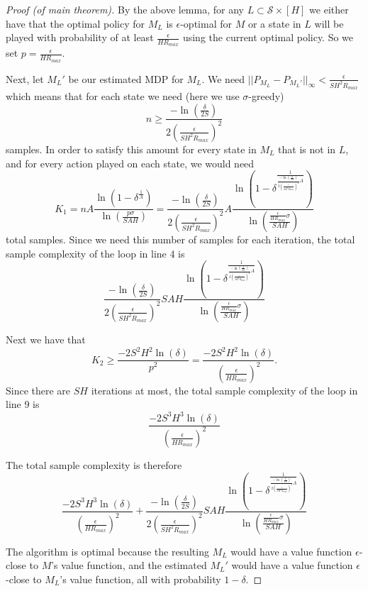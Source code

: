 \documentclass[12pt, letterpaper]{article}
\theoremstyle{definition}
\theoremstyle{remark}
\begin{document}
\begin{proof}[Proof (of main theorem)]
    By the above lemma, for any \(L \subset \mathcal{S} \times [H]\) we either have that the optimal policy for \(M_L\) is \(\epsilon\)-optimal for \(M\) or a state in \(L\) will  be played with probability of at least \(\frac{\epsilon}{HR_{max}}\) using the current optimal policy. So we set \(p = \frac{\epsilon}{HR_{max}}\).

    Next, let \(M_L'\) be our estimated MDP for \(M_L\). We need \(||P_{M_L} - P_{M_{L}'}||_{\infty} < \frac{\epsilon}{SH^2 R_{max}}\) which means that for each state we need (here we use \(\sigma\)-greedy)
    \[n \geq \frac{-\ln(\frac{\delta}{2S})}{2(\frac{\epsilon}{SH^2 R_{max}})^2}\]
    samples. In order to satisfy this amount for every state in \(M_L\) that is not in \(L\), and for every action played on each state, we would need
    \[K_1 = nA \frac{\ln(1 - \delta^{\frac{1}{A}})}{\ln(\frac{p\sigma}{SAH})} = \frac{-\ln(\frac{\delta}{2S})}{2(\frac{\epsilon}{SH^2 R_{max}})^2}A \frac{\ln(1 - \delta^{\frac{1}{\frac{-\ln(\frac{\delta}{2S})}{2(\frac{\epsilon}{SH^2 R_{max}})^2} A}})}{\ln(\frac{\frac{\epsilon}{HR_{max}} \sigma}{SAH})}\]
    total samples. Since we need this number of samples for each iteration, the total sample complexity of the loop in line 4 is
    \[\frac{-\ln(\frac{\delta}{2S})}{2(\frac{\epsilon}{SH^2 R_{max}})^2}SAH \frac{\ln(1 - \delta^{\frac{1}{\frac{-\ln(\frac{\delta}{2S})}{2(\frac{\epsilon}{SH^2 R_{max}})^2} A}})}{\ln(\frac{\frac{\epsilon}{HR_{max}} \sigma}{SAH})}\]

    Next we have that
    \[K_2 \geq \frac{-2S^2H^2 \ln(\delta)}{p^2} = \frac{-2S^2H^2 \ln(\delta)}{(\frac{\epsilon}{HR_{max}})^2}.\]
    Since there are \(SH\) iterations at most, the total sample complexity of the loop in line 9 is
    \[\frac{-2S^3H^3 \ln(\delta)}{(\frac{\epsilon}{HR_{max}})^2}\]

    The total sample complexity is therefore
    \[\frac{-2S^3H^3 \ln(\delta)}{(\frac{\epsilon}{HR_{max}})^2} + \frac{-\ln(\frac{\delta}{2S})}{2(\frac{\epsilon}{SH^2 R_{max}})^2}SAH \frac{\ln(1 - \delta^{\frac{1}{\frac{-\ln(\frac{\delta}{2S})}{2(\frac{\epsilon}{SH^2 R_{max}})^2} A}})}{\ln(\frac{\frac{\epsilon}{HR_{max}} \sigma}{SAH})}\]

    The algorithm is optimal because the resulting \(M_L\) would have a value function \(\epsilon\)-close to \(M\)'s value function, and the estimated \(M_{L}'\) would have a value function \(\epsilon\)-close to \(M_L\)'s value function, all with probability \(1-\delta\).
\end{proof}
\end{document}
